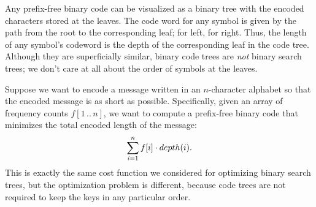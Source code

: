 Any prefix-free binary code can be visualized as a binary tree with the encoded characters stored at the leaves.
The code word for any symbol is given by the path from the root to the corresponding leaf; \mbox{\color{JEblue}} for left, \mbox{\color{JEblue}} for right.
Thus, the length of any symbol’s codeword is the depth of the corresponding leaf in the code tree.
Although they are superficially similar, binary code trees are \textit{not} binary search trees; we don’t care at all about the order of symbols at the leaves.

Suppose we want to encode a message written in an $n$-character alphabet so that the encoded message is as short as possible.
Specifically, given an array of frequency counts $f[1\,..\,n]$, we want to compute a prefix-free binary code that minimizes the total encoded length of the message:
\[
\sum_{i=1}^{n} f[i] \cdot depth(i).
\]
This is exactly the same cost function we considered for optimizing binary search trees, but the optimization problem is different, because code trees are not required to keep the keys in any particular order.


